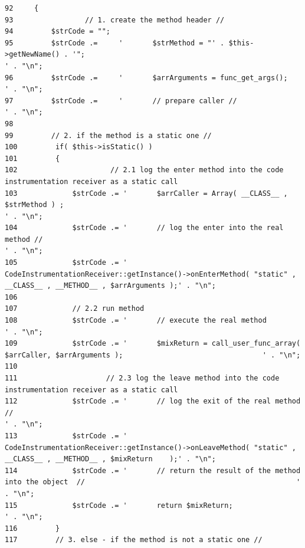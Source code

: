 \begin{Code}\begin{verbatim}92     {
93                 // 1. create the method header //
94         $strCode = "";
95         $strCode .=     '       $strMethod = "' . $this->getNewName() . '";                                                                             ' . "\n";
96         $strCode .=     '       $arrArguments = func_get_args();                                                                                                ' . "\n";
97         $strCode .=     '       // prepare caller //                                                                                                                    ' . "\n";
98         
99         // 2. if the method is a static one //
100         if( $this->isStatic() )
101         {
102                      // 2.1 log the enter method into the code instrumentation receiver as a static call
103             $strCode .= '       $arrCaller = Array( __CLASS__ , $strMethod ) ;                                                          ' . "\n";
104             $strCode .= '       // log the enter into the real method //                                                                                ' . "\n";
105             $strCode .= '       CodeInstrumentationReceiver::getInstance()->onEnterMethod( "static" , __CLASS__ , __METHOD__ , $arrArguments );' . "\n";
106 
107             // 2.2 run method
108             $strCode .= '       // execute the real method                                                                                                              ' . "\n";
109             $strCode .= '       $mixReturn = call_user_func_array( $arrCaller, $arrArguments );                                 ' . "\n";
110 
111                     // 2.3 log the leave method into the code instrumentation receiver as a static call
112             $strCode .= '       // log the exit of the real method //                                                                                   ' . "\n";
113             $strCode .= '       CodeInstrumentationReceiver::getInstance()->onLeaveMethod( "static" , __CLASS__ , __METHOD__ , $mixReturn    );' . "\n";
114             $strCode .= '       // return the result of the method into the object  //                                                  ' . "\n";
115             $strCode .= '       return $mixReturn;                                                                                                                              ' . "\n";
116         }
117         // 3. else - if the method is not a static one //

\end{verbatim}
\end{Code}

